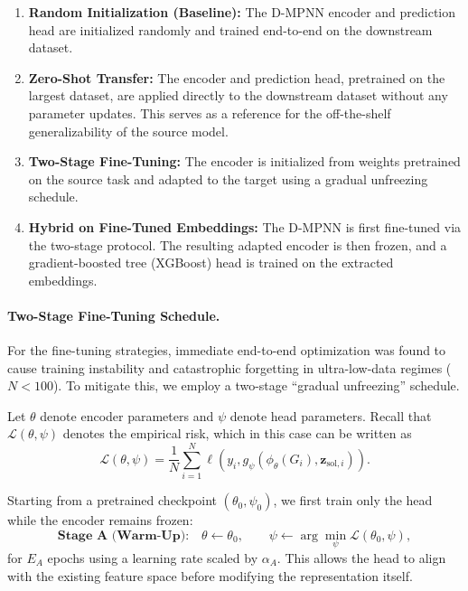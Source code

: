 \begin{enumerate} \item \textbf{Random Initialization (Baseline):} The D-MPNN encoder and prediction head are initialized randomly and trained end-to-end on the downstream dataset. \item \textbf{Zero-Shot Transfer:} The encoder and prediction head, pretrained on the largest dataset, are applied directly to the downstream dataset without any parameter updates. This serves as a reference for the off-the-shelf generalizability of the source model. \item \textbf{Two-Stage Fine-Tuning:} The encoder is initialized from weights pretrained on the source task and adapted to the target using a gradual unfreezing schedule. \item \textbf{Hybrid on Fine-Tuned Embeddings:} The D-MPNN is first fine-tuned via the two-stage protocol. The resulting adapted encoder is then frozen, and a gradient-boosted tree (XGBoost) head is trained on the extracted embeddings. \end{enumerate}

\paragraph{Two-Stage Fine-Tuning Schedule.}

For the fine-tuning strategies, immediate end-to-end optimization was found to cause training instability and catastrophic forgetting in ultra-low-data regimes ($N < 100$). To mitigate this, we employ a two-stage ``gradual unfreezing'' schedule.

Let $\theta$ denote encoder parameters and $\psi$ denote head parameters. 
Recall that $\mathcal{L}(\theta,\psi)$ denotes the empirical risk, which in this case can be written as
\[
\mathcal{L}(\theta,\psi)
=
\frac{1}{N} \sum_{i=1}^N 
\ell\!\left(
y_i,
g_{\psi}(\phi_{\theta}(G_i), \mathbf z_{\mathrm{sol},i})
\right).
\]

Starting from a pretrained checkpoint $(\theta_0,\psi_0)$, we first train only the head while the encoder remains frozen:
\begin{equation}
\textbf{Stage A (Warm-Up):}\quad 
\theta \leftarrow \theta_0, 
\qquad
\psi \leftarrow \arg\min_{\psi} \mathcal{L}(\theta_0,\psi),
\end{equation}
for $E_A$ epochs using a learning rate scaled by $\alpha_A$. This allows the head to align with the existing feature space before modifying the representation itself.


